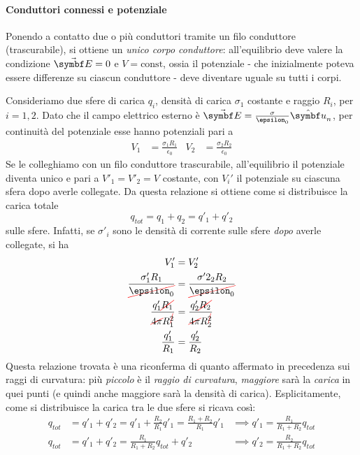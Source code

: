 \paragraph{Conduttori connessi e potenziale}
Ponendo a contatto due o più conduttori tramite un filo conduttore (trascurabile), si ottiene un \textit{unico corpo conduttore}: all'equilibrio deve valere la condizione $\vba{E}=0$ e $V=\text{const}$, ossia il potenziale - che inizialmente poteva essere differenze su ciascun conduttore - deve diventare uguale su tutti i corpi.	
	\begin{example}
		Consideriamo due sfere di carica $q_i$, densità di carica $\sigma_1$ costante e raggio $R_i$, per $i = 1, 2$. Dato che il campo elettrico esterno è $\vba{E}=\frac{\sigma}{\epsilon_0}\vbh{u}_n$, per continuità del potenziale esse hanno potenziali pari a
		\begin{align*}
			V_1&=\frac{\sigma_1 R_1}{\epsilon_0} & V_2&=\frac{\sigma_2 R_2}{\epsilon_0}
		\end{align*}
		Se le colleghiamo con un filo conduttore trascurabile, all'equilibrio il potenziale diventa unico e pari a $V'_1=V'_2=V$ costante, con $V_i'$ il potenziale su ciascuna sfera dopo averle collegate. Da questa relazione si ottiene come si distribuisce la carica totale
		\begin{equation*}
			q_{tot}=q_1+q_2=q'_1+q'_2
		\end{equation*}
		sulle sfere. Infatti, se $\sigma'_i$ sono le densità di corrente sulle sfere \textit{dopo} averle collegate, si ha
		\begin{gather*}
			V'_1=V'_2\\
			\frac{\sigma'_1R_1}{\Ccancel[red]{\epsilon_0}}=\frac{\sigma'2_2R_2}{\Ccancel[red]{\epsilon_0}}\\
			\frac{q'_1\Ccancel[red]{R_1}}{\Ccancel[red]{4\pi} R_1^{\Ccancel[red]{2}}}=\frac{q'_2\Ccancel[red]{R_2}}{\Ccancel[red]{4\pi} R_2^{\Ccancel[red]{2}}}\\
			\frac{q'_1}{R_1}=\frac{q'_2}{R_2}
		\end{gather*}
		Questa relazione trovata è una riconferma di quanto affermato in precedenza sui raggi di curvatura: più \textit{piccolo} è il \textit{raggio di curvatura}, \textit{maggiore} sarà la \textit{carica} in quei punti (e quindi anche maggiore sarà la densità di carica). Esplicitamente, come si distribuisce la carica tra le due sfere si ricava così:
		\begin{align*}
			q_{tot}&=q'_1+q'_2=q'_1+\frac{R_2}{R_1}q'_1=\frac{R_1+R_2}{R_1}q'_1&\implies q'_1=\frac{R_1}{R_1+R_2}q_{tot}\\
			q_{tot}&=q'_1+q'_2=\frac{R_1}{R_1+R_2}q_{tot}+q'_2 &\implies q'_2=\frac{R_2}{R_1+R_2}q_{tot}
		\end{align*}
	\end{example}
